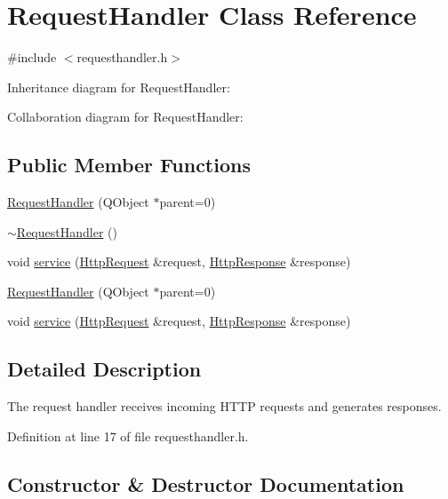 \hypertarget{class_request_handler}{}\section{Request\+Handler Class Reference}
\label{class_request_handler}


{\ttfamily \#include $<$requesthandler.\+h$>$}



Inheritance diagram for Request\+Handler\+:


Collaboration diagram for Request\+Handler\+:
\subsection*{Public Member Functions}
\begin{DoxyCompactItemize}
\item 
\mbox{\hyperlink{class_request_handler_a01277e86309630826aa760f6d3eb3788}{Request\+Handler}} (Q\+Object $\ast$parent=0)
\item 
\mbox{\hyperlink{class_request_handler_a33488d8c2fa1f2c15193c9918960171a}{$\sim$\+Request\+Handler}} ()
\item 
void \mbox{\hyperlink{class_request_handler_a46dbcda155cd987e45d55b2941dbfd71}{service}} (\mbox{\hyperlink{classstefanfrings_1_1_http_request}{Http\+Request}} \&request, \mbox{\hyperlink{classstefanfrings_1_1_http_response}{Http\+Response}} \&response)
\item 
\mbox{\hyperlink{class_request_handler_a01277e86309630826aa760f6d3eb3788}{Request\+Handler}} (Q\+Object $\ast$parent=0)
\item 
void \mbox{\hyperlink{class_request_handler_a46dbcda155cd987e45d55b2941dbfd71}{service}} (\mbox{\hyperlink{classstefanfrings_1_1_http_request}{Http\+Request}} \&request, \mbox{\hyperlink{classstefanfrings_1_1_http_response}{Http\+Response}} \&response)
\end{DoxyCompactItemize}


\subsection{Detailed Description}
The request handler receives incoming H\+T\+TP requests and generates responses. 

Definition at line 17 of file requesthandler.\+h.



\subsection{Constructor \& Destructor Documentation}
\mbox{\label{class_request_handler_a01277e86309630826aa760f6d3eb3788}} 
